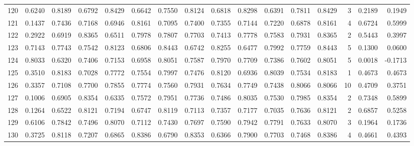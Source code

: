 \begin{tabular}{lrrrrrrrrrrrrrrr}
120 &      0.6240 &  0.8189 &  0.6792 &  0.8429 &  0.6642 &  0.7550 &  0.8124 &  0.6818 &  0.8298 &  0.6391 &   0.7811 &     0.8429 &      3 &                    0.2189 &                     0.1949 \\
121 &      0.1437 &  0.7436 &  0.7168 &  0.6946 &  0.8161 &  0.7095 &  0.7400 &  0.7355 &  0.7144 &  0.7220 &   0.6878 &     0.8161 &      4 &                    0.6724 &                     0.5999 \\
122 &      0.2922 &  0.6919 &  0.8365 &  0.6511 &  0.7978 &  0.7807 &  0.7703 &  0.7413 &  0.7778 &  0.7583 &   0.7931 &     0.8365 &      2 &                    0.5443 &                     0.3997 \\
123 &      0.7143 &  0.7743 &  0.7542 &  0.8123 &  0.6806 &  0.8443 &  0.6742 &  0.8255 &  0.6477 &  0.7992 &   0.7759 &     0.8443 &      5 &                    0.1300 &                     0.0600 \\
124 &      0.8033 &  0.6320 &  0.7406 &  0.7153 &  0.6958 &  0.8051 &  0.7587 &  0.7970 &  0.7709 &  0.7386 &   0.7602 &     0.8051 &      5 &                    0.0018 &                    -0.1713 \\
125 &      0.3510 &  0.8183 &  0.7028 &  0.7772 &  0.7554 &  0.7997 &  0.7476 &  0.8120 &  0.6936 &  0.8039 &   0.7534 &     0.8183 &      1 &                    0.4673 &                     0.4673 \\
126 &      0.3357 &  0.7108 &  0.7700 &  0.7855 &  0.7774 &  0.7560 &  0.7931 &  0.7634 &  0.7749 &  0.7438 &   0.8066 &     0.8066 &     10 &                    0.4709 &                     0.3751 \\
127 &      0.1006 &  0.6905 &  0.8354 &  0.6335 &  0.7572 &  0.7951 &  0.7736 &  0.7486 &  0.8035 &  0.7530 &   0.7985 &     0.8354 &      2 &                    0.7348 &                     0.5899 \\
128 &      0.1264 &  0.6522 &  0.8121 &  0.7194 &  0.6747 &  0.8119 &  0.7113 &  0.7357 &  0.7177 &  0.7035 &   0.7636 &     0.8121 &      2 &                    0.6857 &                     0.5258 \\
129 &      0.6106 &  0.7842 &  0.7496 &  0.8070 &  0.7112 &  0.7430 &  0.7697 &  0.7590 &  0.7942 &  0.7791 &   0.7633 &     0.8070 &      3 &                    0.1964 &                     0.1736 \\
130 &      0.3725 &  0.8118 &  0.7207 &  0.6865 &  0.8386 &  0.6790 &  0.8353 &  0.6366 &  0.7900 &  0.7703 &   0.7468 &     0.8386 &      4 &                    0.4661 &                     0.4393 \\

\end{tabular}
